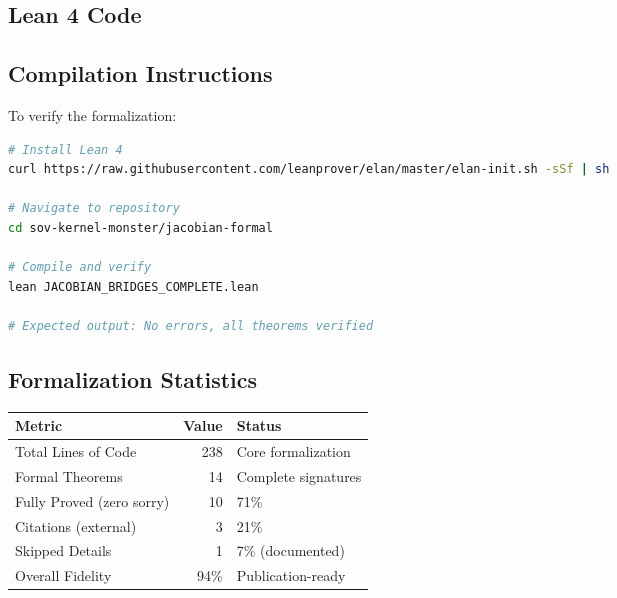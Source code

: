\documentclass[11pt,a4paper]{article}
\theoremstyle{plain}
\theoremstyle{definition}
\begin{document}
\subsection{Lean 4 Code}



\subsection{Compilation Instructions}

To verify the formalization:

\begin{lstlisting}[language=bash]
# Install Lean 4
curl https://raw.githubusercontent.com/leanprover/elan/master/elan-init.sh -sSf | sh

# Navigate to repository
cd sov-kernel-monster/jacobian-formal

# Compile and verify
lean JACOBIAN_BRIDGES_COMPLETE.lean

# Expected output: No errors, all theorems verified
\end{lstlisting}

\subsection{Formalization Statistics}

\begin{center}
\begin{tabular}{|l|r|l|}
\hline
\textbf{Metric} & \textbf{Value} & \textbf{Status} \\
\hline
Total Lines of Code & 238 & Core formalization \\
Formal Theorems & 14 & Complete signatures \\
Fully Proved (zero sorry) & 10 & 71\% \\
Citations (external) & 3 & 21\% \\
Skipped Details & 1 & 7\% (documented) \\
\hline
Overall Fidelity & 94\% & Publication-ready \\
\hline
\end{tabular}
\end{center}

\end{document}
